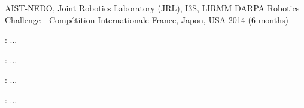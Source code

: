
\begin{cventries}
  \cventry
  {AIST-NEDO, Joint Robotics Laboratory (JRL), I3S, LIRMM} %
  {DARPA Robotics Challenge - Compétition Internationale} %
  {France, Japon, USA} %
  {2014 (6 months)} %
  {
    \begin{cvitems} %
    \item {}: ...
    \item {}: ...
    \item {}: ...
    \item {}: ...
    \end{cvitems}
  }
\end{cventries}
